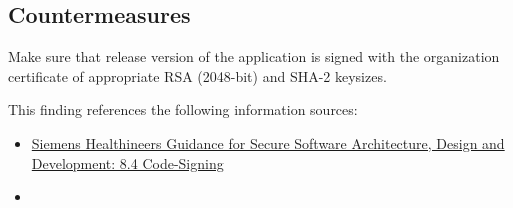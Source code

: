 \subsection*{Countermeasures}

Make sure that release version of the application is signed with the organization certificate of appropriate RSA (2048-bit)
and SHA-2 keysizes.



This finding references the following information sources:

\begin{itemize}
	\item \href{https://doku-center.med.siemens.de/regelwerke/L4U-Intranet/GD/GD-41/GD-41-03-E.pdf}{Siemens Healthineers Guidance for Secure Software Architecture, Design and
	Development: 8.4 Code-Signing}
	\item {}
\end{itemize}

